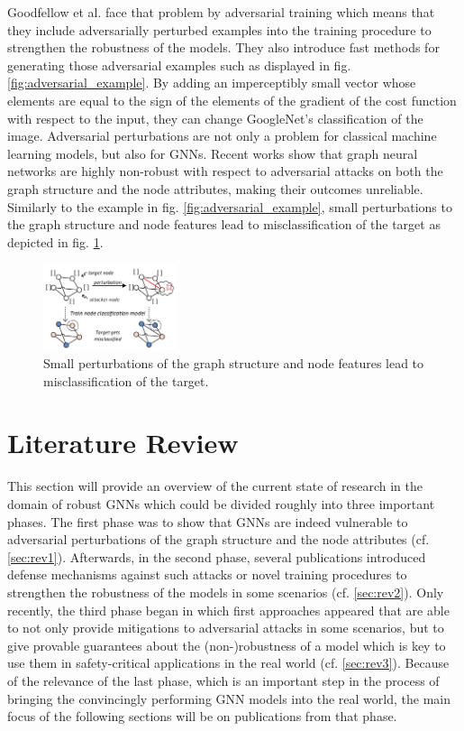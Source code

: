 \documentclass[a4paper,preprint]{sig-alternate}
\begin{document}
Goodfellow et al. \cite{goodfellow2015explaining} face that problem by adversarial training which means that they include adversarially 
perturbed examples into the training procedure to strengthen the robustness of the models. They also introduce fast methods for generating 
those adversarial examples such as displayed in fig. \ref{fig:adversarial_example}. By adding an imperceptibly small vector whose elements
are equal to the sign of the elements of the gradient of the cost function with respect to the input, they can change GoogleNet's classification
of the image.\cite{goodfellow2015explaining}\newline
Adversarial perturbations are not only a problem for classical machine learning models, but also for GNNs.
Recent works show that graph neural networks are highly non-robust with respect to adversarial attacks on both the graph
structure and the node attributes, making their outcomes unreliable.\cite{Z_gner_2019}
Similarly to the example in fig. \ref{fig:adversarial_example}, small perturbations to the graph structure and node features lead to 
misclassification of the target as depicted in fig. \ref{fig:adversarial_GNN}.

\begin{figure}[h]
    \centering
    \includegraphics[width=0.35\textwidth]{img/adversarial_GNN.png}
    \caption{Small perturbations of the graph structure and node features lead to misclassification of the target. \cite{Z_gner_2018}}
    \label{fig:adversarial_GNN}
\end{figure}

\section{Literature Review}
\label{sec:literature}

This section will provide an overview of the current state of research in the domain of robust GNNs which could be divided
roughly into three important phases.
The first phase was to show that GNNs are indeed vulnerable to adversarial perturbations of the graph structure and the node attributes (cf. \ref{sec:rev1}).
Afterwards, in the second phase, several publications introduced defense mechanisms against such attacks or novel training procedures 
to strengthen the robustness of the models in some scenarios (cf. \ref{sec:rev2}). Only recently, the third phase began in which first approaches appeared
that are able to not only provide mitigations to adversarial attacks in some scenarios, but to give provable guarantees about the (non-)robustness 
of a model which is key to use them in safety-critical applications in the real world (cf. \ref{sec:rev3}). Because of the relevance of the last phase, which 
is an important step in the process of bringing the convincingly performing GNN models into the real world, the main focus of the following sections
will be on publications from that phase.
\end{document}
